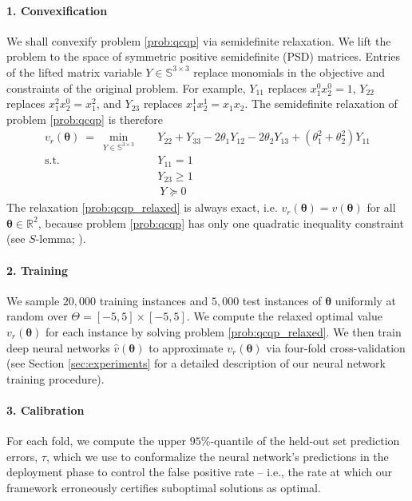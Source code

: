\documentclass[10pt]{article} %
\theoremstyle{plain}
\theoremstyle{definition}
\theoremstyle{remark}
\begin{document}
\paragraph{1. Convexification} We shall convexify problem \cref{prob:qcqp} via semidefinite relaxation. We lift the problem to the space of symmetric positive semidefinite (PSD) matrices. Entries of the lifted matrix variable $Y \in \mathbb{S}^{3 \times 3}$ replace monomials in the objective and constraints of the original problem. For example, $Y_{11}$ replaces $x_1^0 x_2^0 = 1$, $Y_{22}$ replaces $x_1^2 x_2^0 = x_1^2$, and $Y_{23}$ replaces $x_1^1 x_2^1 = x_1 x_2$. The semidefinite relaxation of problem \cref{prob:qcqp} is therefore
\begin{equation}
\begin{aligned}
v_r(\bm{\theta}) ~=~ \min_{Y \in \mathbb{S}^{3 \times 3}} \quad 
&Y_{22} + Y_{33} - 2 \theta_1 Y_{12} - 2 \theta_2 Y_{13} + (\theta_1^2 + \theta_2^2) Y_{11} \\ 
\text{s.t.}\quad & Y_{11} = 1 \\[3pt]
& Y_{23} \geq 1 \\[4pt]
& ~Y \succeq 0
\end{aligned}
\label{prob:qcqp_relaxed}
\end{equation}
The relaxation \cref{prob:qcqp_relaxed} is always exact, i.e. $v_r(\bm{\theta}) = v(\bm{\theta})$ for all $\bm{\theta} \in \mathbb{R}^2$, because problem \cref{prob:qcqp}{}{} has only one quadratic inequality constraint (see $S$-lemma; \cite{boyd2004convex}). 

\paragraph{2. Training} We sample $20{,}000$ training instances and $5{,}000$ test instances of $\bm{\theta}$ uniformly at random over $\Theta = [-5,5] \times [-5,5]$. We compute the relaxed optimal value $v_r(\bm{\theta})$ for each instance by solving problem \cref{prob:qcqp_relaxed}{}{}. We then train deep neural networks $\hat{v}(\bm{\theta})$ to approximate $v_r(\bm{\theta})$ via four-fold cross-validation (see Section \ref{sec:experiments} for a detailed description of our neural network training procedure).

\paragraph{3. Calibration} For each fold, we compute the upper $95\%$-quantile of the held-out set prediction errors, $\tau$, which we use to conformalize the neural network's predictions in the deployment phase to control the false positive rate -- i.e., the rate at which our framework erroneously certifies suboptimal solutions as optimal.
\end{document}
